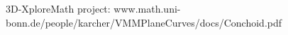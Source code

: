 \documentclass[preview]{standalone}
\begin{document}
\begin{center}
3D-XploreMath project: www.math.uni-bonn.de/people/karcher/VMMPlaneCurves/docs/Conchoid.pdf
\end{center}
\end{document}
